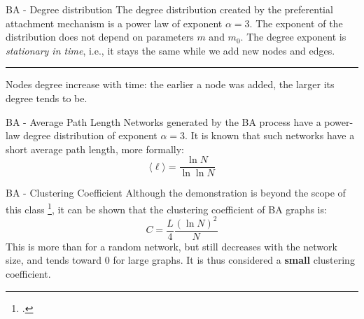 \begin{textbox}{BA - Degree distribution }
    The degree distribution created by the preferential attachment mechanism is a power law of exponent $ \alpha=3$. The exponent of the distribution does not depend on parameters $m$ and $m_0$. The degree exponent is \textit{stationary in time}, i.e., it stays the same while we add new nodes and edges.

    \noindent\rule{4cm}{0.1pt}

    Nodes degree increase with time: the earlier a node was added, the larger its degree tends to be. %
\end{textbox}


\begin{textbox}{BA - Average Path Length }
    Networks generated by the BA process have a power-law degree distribution of exponent $ \alpha=3$. It is known that such networks have a short average path length, more formally:
    \[
        \langle \ell \rangle=\frac{\ln N}{\ln \ln N}
    \]
\end{textbox}


\begin{textbox}{BA - Clustering Coefficient }
    Although the demonstration is beyond the scope of this class \footcite{barabasi1999emergence}, it can be shown that the clustering coefficient of BA graphs is:
    \[
        C=\frac{L}{4}\frac{(\ln N)^2}{N}
    \]
    This is more than for a random network, but still decreases with the network size, and tends toward 0 for large graphs. It is thus considered a \textbf{small} clustering coefficient.
\end{textbox}




